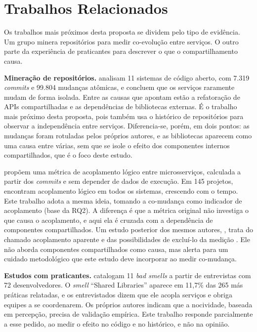 \section{Trabalhos Relacionados}
\label{sec:relacionados}

Os trabalhos mais próximos desta proposta se dividem pelo tipo de evidência. Um grupo minera repositórios para medir co-evolução entre serviços. O outro parte da experiência de praticantes para descrever o que o compartilhamento causa.

\textbf{Mineração de repositórios.}  analisam 11 sistemas de código aberto, com 7.319 \textit{commits} e 99.804 mudanças atômicas, e concluem que os serviços raramente mudam de forma isolada. Entre as causas que apontam estão a refatoração de APIs compartilhadas e as dependências de bibliotecas externas. É o trabalho mais próximo desta proposta, pois também usa o histórico de repositórios para observar a independência entre serviços. Diferencia-se, porém, em dois pontos: as mudanças foram rotuladas pelos próprios autores, e as bibliotecas aparecem como uma causa entre várias, sem que se isole o efeito dos componentes internos compartilhados, que é o foco deste estudo.

 propõem uma métrica de acoplamento lógico entre microsserviços, calculada a partir dos \textit{commits} e sem depender de dados de execução. Em 145 projetos, encontram acoplamento lógico em todos os sistemas, crescendo com o tempo. Este trabalho adota a mesma ideia, tomando a co-mudança como indicador de acoplamento (base da RQ2). A diferença é que a métrica original não investiga o que causa o acoplamento, e aqui ela é cruzada com a dependência de componentes compartilhados. Um estudo posterior dos mesmos autores, , trata do chamado acoplamento aparente e das possibilidades de excluí-lo da medição . Ele não aborda componentes compartilhados como causa, mas alerta para um cuidado metodológico que este estudo deve incorporar ao medir co-mudança.

\textbf{Estudos com praticantes.}  catalogam 11 \textit{bad smells} a partir de entrevistas com 72 desenvolvedores. O \textit{smell} ``Shared Libraries'' aparece em 11,7\% das 265 más práticas relatadas, e os entrevistados dizem que ele acopla serviços e obriga equipes a se coordenarem. Os próprios autores indicam que a nocividade, baseada em percepção, precisa de validação empírica. Este trabalho responde parcialmente a esse pedido, ao medir o efeito no código e no histórico, e não na opinião.

